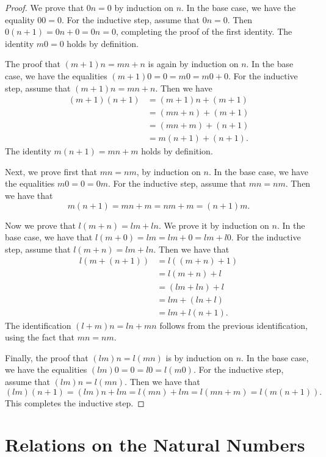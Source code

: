 \begin{proof}
  We prove that $0n=0$ by induction on $n$. In the base case, we have the equality $00=0$. For the inductive step, assume that $0n=0$. Then $0(n+1)=0n+0=0n=0$, completing the proof of the first identity. The identity $m0=0$ holds by definition.

  The proof that $(m+1)n=mn+n$ is again by induction on $n$. In the base case, we have the equalities $(m+1)0=0=m0=m0+0$. For the inductive step, assume that $(m+1)n=mn+n$. Then we have
  \begin{align*}
    (m+1)(n+1)
    & = (m+1)n+(m+1) \\
    & = (mn+n)+(m+1) \\
    & = (mn+m)+(n+1) \\
    & = m(n+1)+(n+1).
  \end{align*}
  The identity $m(n+1)=mn+m$ holds by definition.

  Next, we prove first that $mn=nm$, by induction on $n$. In the base case, we have the equalities $m0=0=0m$. For the inductive step, assume that $mn=nm$. Then we have that
  \begin{equation*}
    m(n+1)=mn+m=nm+m=(n+1)m.
  \end{equation*}

  Now we prove that $l(m+n)=lm+ln$. We prove it by induction on $n$. In the base case, we have that $l(m+0)=lm=lm+0= lm+l0$. For the inductive step, assume that $l(m+n)=lm+ln$. Then we have that
  \begin{align*}
    l(m+(n+1))
    & = l((m+n)+1) \\
    & = l(m+n)+l \\
    & = (lm+ln)+l \\
    & = lm+(ln+l) \\
    & = lm+l(n+1).
  \end{align*}
  The identification $(l+m)n=ln+mn$ follows from the previous identification, using the fact that $mn=nm$.

  Finally, the proof that $(lm)n=l(mn)$ is by induction on $n$. In the base case, we have the equalities $(lm)0=0=l0=l(m0)$. For the inductive step, assume that $(lm)n=l(mn)$. Then we have that
  \begin{equation*}
    (lm)(n+1)= (lm)n+lm=l(mn)+lm=l(mn+m)=l(m(n+1)).
  \end{equation*}
  This completes the inductive step.
\end{proof}

\section{Relations on the Natural Numbers}

